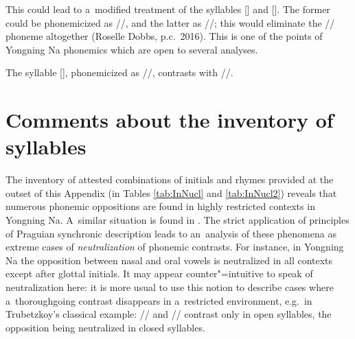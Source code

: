 			This could lead to a~modified treatment of the syllables [] and []. The former could be phonemicized as //, and the latter as //; this would eliminate the // phoneme altogether (Roselle Dobbs, p.c.\ 2016). This is one of the points of Yongning Na phonemics which are open to several analyses.
			
			The syllable [], phonemicized as //, contrasts with //.
			

			\section{Comments about the inventory of syllables}
			\label{sec:commentsabouttheinventoryofsyllables}
			
			The inventory of attested combinations of initials and rhymes provided at the outset of this Appendix (in Tables \ref{tab:InNucl} and \ref{tab:InNucl2}) reveals that numerous phonemic oppositions are found in highly restricted contexts
			in Yongning Na. A~similar situation is found in
			 \citep{michaud2006c}. The strict application of principles of
			Praguian synchronic description leads to an~analysis of these
			phenomena as extreme cases of \textit{neutralization} of phonemic contrasts. For instance, in Yongning Na the opposition between nasal and
			oral vowels is neutralized in all contexts except after glottal
			initials. It may appear counter"=intuitive to speak of neutralization
			here: it is more usual to use this notion to describe cases
			where a~thoroughgoing contrast disappears in a~restricted environment,
			e.g.~in Trubetzkoy’s classical example:  // and // contrast
			only in open syllables, the opposition being neutralized in closed
			syllables.
